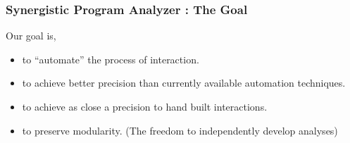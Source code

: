 % 
% 

\begin{frame}
  \frametitle{Synergistic Program Analyzer : The Goal}

  Our goal is,

\begin{itemize}
    \item<2-> to ``automate'' the process of interaction.
    \item<3-> to achieve better precision than currently available automation techniques.
    \item<4-> to achieve as close a precision to hand built interactions.
    \item<5-> to preserve modularity. (The freedom to independently develop analyses)

\end{itemize}
\end{frame}


